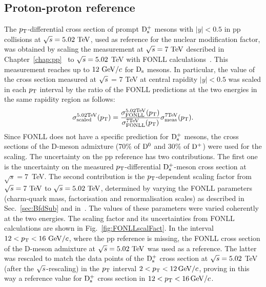 \subsection{Proton-proton reference}
\label{sec:PPrefSyst}
The $p_{\rm T}$-differential cross section of prompt ${\rm D_s^+}$ mesons with 
$|y|<0.5$ in pp collisions at $\sqrt s=5.02~\mathrm{TeV}$, used as reference 
for the nuclear modification factor, was obtained by scaling the 
measurement at $\sqrt{s}=7~\mathrm{TeV}$ described in 
Chapter~\ref{chap:pp}~\cite{Acharya:2017jgo} to $\sqrt{s} = 5.02$ TeV 
with FONLL calculations~\cite{Cacciari:2012ny}. 
This measurement 
reaches up to $12~\mathrm{GeV}/c$ for ${\rm D_s}$ mesons.
In particular, the value of the cross section measured at $\sqrt{s}$ = 7 TeV 
at central rapidity $|y| < 0.5$ was scaled in each $p_{\rm T}$ interval by 
the ratio of the FONLL predictions at the two energies in the same rapidity region as follows:
\begin{equation}
\label{eq:scalingPP}
\sigma^{\rm 5.02 TeV}_{\rm scaled} (p_{\rm T}) = \frac{\sigma^{\rm 5.02 TeV}_{\rm FONLL} (p_{\rm T})}{\sigma^{\rm 7 TeV}_{\rm FONLL} (p_{\rm T})} \sigma^{\rm 7 TeV}_{\rm meas} (p_{\rm T}).
\end{equation}
Since FONLL does not have a specific prediction for ${\rm D_s^+}$
mesons, the cross sections of the D-meson admixture (70\% of ${\rm D^0}$ and 30\% of ${\rm D^+}$) were used for the
scaling. The uncertainty on the pp reference 
has two contributions. The first one is the uncertainty on the measured 
$p_{\rm T}$-differential ${\rm D_s^+}$-meson cross section at $\sqrt s=7$~TeV.
The second contribution is the $p_{\rm T}$-dependent scaling factor 
from $\sqrt{s}=7~\mathrm{TeV}$ to $\sqrt{s}=5.02~\mathrm{TeV}$, determined by varying
the FONLL parameters (charm-quark mass, factorisation and renormalisation scales) 
as described in Sec.~\ref{sec:BfdSub} and in~\cite{Averbeck:2011ga}. The values of these parameters were 
varied coherently at the two energies. The scaling factor 
and its uncertainties from FONLL calculations are shown in Fig.~\ref{fig:FONLLscalFact}.
In the interval $12<p_{\rm T}<16~\mathrm{GeV}/c$, where the pp reference is missing, the FONLL cross section of the D-meson admixture at 
$\sqrt s=5.02~\mathrm{TeV}$ was used as a reference. 
The latter was rescaled to match the data points of the ${\rm D_s^+}$ cross section at $\sqrt{s}=5.02 $ TeV (after the $\sqrt{s}$-rescaling)
in the $p_{\rm T}$ interval $2 < p_{\rm T} < 12 \, \mathrm{GeV}/c$, proving in this way a reference value for ${\rm D_s^+}$ cross section in  $12 < p_{\rm T} < 16 \, \mathrm{GeV}/c$.
